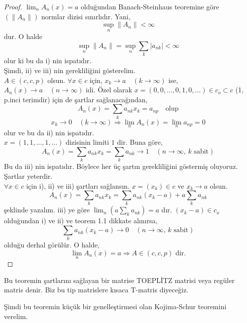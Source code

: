 \begin{proof}
$\lim_nA_n(x)=a$ olduğundan Banach-Steinhaus teoremine göre $(\|A_n\|)$ normlar dizisi sınırlıdır. Yani, $$\sup_n\|A_n\|<\infty$$ dur. O halde
$$
\sup_n\|A_n\|=\sup_n\sum_k|a_{nk}|<\infty
$$ olur ki bu da i) nin ispatıdır.\\[5pt]

Şimdi, ii) ve iii) nin gerekliliğini gösterelim.\\[5pt]

$A\in(c,c,p)$ olsun. $\forall x\in c$ için, $x_k\to a\quad(k\to\infty)$ ise, $A_n(x)\to a\quad(n\to\infty)$ idi. Özel olarak $x=(0,0,\ldots,0,1,0,\ldots)\in c_o\subset c$ (1, p.inci terimdir) için de şartlar sağlanacağından,
$$
A_n(x)=\sum_ka_{nk}x_k=a_{np}\quad\text{olup}
$$
$$
x_k\to 0\quad(k\to\infty)\Rightarrow\lim_nA_n(x)=\lim_na_{np}=0
$$
olur ve bu da ii) nin ispatıdır.\\[5pt]

$x=(1,1,\ldots,1,\ldots)$ dizisinin limiti $1$ dir. Buna göre,
$$
A_n(x)=\sum_ka_{nk}x_k=\sum_ka_{nk}\to 1\quad(n\to\infty,\, k\text{ sabit})
$$
Bu da iii) nin ispatıdır. Böylece her üç şartın gerekliliğini göstermiş oluyoruz.\\[5pt]

Şartlar yeterdir.\\[5pt]

$\forall x\in c$ için i), ii) ve iii) şartları sağlansın. $x=(x_k)\in c$ ve $x_k\to a$ olsun.
$$
A_n(x)=\sum_ka_{nk}x_k=\sum_ka_{nk}(x_k-a)+a\sum_ka_{nk}
$$
şeklinde yazalım. iii) ye göre $\lim_n(a\sum\limits_ka_{nk})=a$ dır. $(x_k-a)\in c_o$ olduğundan i) ve ii) ve teorem 1.1 dikkate alınırsa,
$$
\sum_ka_{nk}(x_k-a)\to 0\quad(n\to\infty,\, k\text{ sabit})
$$
olduğu derhal görülür. O halde,
$$
\lim_nA_n(x)=a\Rightarrow A\in(c,c,p)\text{ dir.}
$$
\end{proof}

Bu teoremin şartlarını sağlayan bir matrise TOEPLİTZ matrisi  veya regüler matris denir. Biz bu tip matrislere kısaca T-matris diyeceğiz.

Şimdi bu teoremin küçük bir genelleştirmesi olan Kojima-Schur teoremini verelim.\

